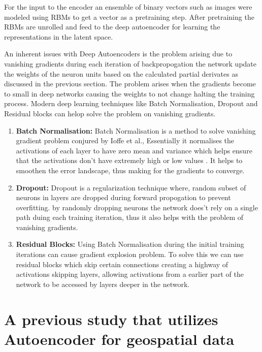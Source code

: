 \documentclass[a4paper,12pt]{Classes/RoboticsLaTeX}
\begin{document}
	For the input to the encoder an ensemble of binary vectors such as images were modeled using \ac{RBMs} to get a vector as a pretraining step. After pretraining the \ac{RBMs} are unrolled and feed to the 
	deep autoencoder for learning the representations in the latent space.

	An inherent issues with Deep Autoencoders is the problem arising due to vanishing gradients during each iteration of backpropogation the network update the weights of the neuron units based on the calculated partial 
	derivates as discussed in the previous section. The problem arises when the gradients become to small in deep networks causing the weights to not change halting the training process. Modern deep learning techniques like
	Batch Normalisation, Dropout and Residual blocks can helop solve the problem on vanishing gradients.


	\begin{enumerate}
		\item \textbf{Batch Normalisation:} Batch Normalisation is a method to solve vanishing gradient problem conjured by Ioffe et al.\cite{Ioffe}, Essentially it normalises the activations of each layer to have zero mean and variance which helps ensure that the activations don't have extremely high or low values . It helps to smoothen the error landscape, thus making for the gradients to converge.
		
		\item \textbf{Dropout:} Dropout is a regularization technique where, random subset of neurons in layers are dropped during forward propogation to prevent overfitting. by randomly dropping neurons the network does't rely on a single path duing each training iteration, thus it also helps with the problem of vanishing gradients.
		
		\item \textbf{Residual Blocks:} Using Batch Normalisation during the initial training iterations can cause gradient explosion problem. To solve this we can use residual blocks which skip certain connections creating a highway of activations skipping layers, allowing activations from a earlier part of the network to be accessed by layers deeper in the network.
	\end{enumerate}
	

	\section{A previous study that utilizes Autoencoder for geospatial data}
\end{document}
